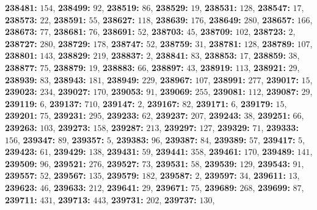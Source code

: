 \textsf{\bfseries 238481:} $154$, \textsf{\bfseries 238499:} $92$, \textsf{\bfseries 238519:} $86$, \textsf{\bfseries 238529:} $19$, \textsf{\bfseries 238531:} $128$, \textsf{\bfseries 238547:} $17$, \textsf{\bfseries 238573:} $22$, \textsf{\bfseries 238591:} $55$, \textsf{\bfseries 238627:} $118$, \textsf{\bfseries 238639:} $176$, \textsf{\bfseries 238649:} $280$, \textsf{\bfseries 238657:} $166$, \textsf{\bfseries 238673:} $77$, \textsf{\bfseries 238681:} $76$, \textsf{\bfseries 238691:} $52$, \textsf{\bfseries 238703:} $45$, \textsf{\bfseries 238709:} $102$, \textsf{\bfseries 238723:} $2$, \textsf{\bfseries 238727:} $280$, \textsf{\bfseries 238729:} $178$, \textsf{\bfseries 238747:} $52$, \textsf{\bfseries 238759:} $31$, \textsf{\bfseries 238781:} $128$, \textsf{\bfseries 238789:} $107$, \textsf{\bfseries 238801:} $143$, \textsf{\bfseries 238829:} $219$, \textsf{\bfseries 238837:} $2$, \textsf{\bfseries 238841:} $83$, \textsf{\bfseries 238853:} $17$, \textsf{\bfseries 238859:} $38$, \textsf{\bfseries 238877:} $75$, \textsf{\bfseries 238879:} $19$, \textsf{\bfseries 238883:} $66$, \textsf{\bfseries 238897:} $43$, \textsf{\bfseries 238919:} $113$, \textsf{\bfseries 238921:} $29$, \textsf{\bfseries 238939:} $83$, \textsf{\bfseries 238943:} $181$, \textsf{\bfseries 238949:} $229$, \textsf{\bfseries 238967:} $107$, \textsf{\bfseries 238991:} $277$, \textsf{\bfseries 239017:} $15$, \textsf{\bfseries 239023:} $234$, \textsf{\bfseries 239027:} $170$, \textsf{\bfseries 239053:} $91$, \textsf{\bfseries 239069:} $255$, \textsf{\bfseries 239081:} $112$, \textsf{\bfseries 239087:} $29$, \textsf{\bfseries 239119:} $6$, \textsf{\bfseries 239137:} $710$, \textsf{\bfseries 239147:} $2$, \textsf{\bfseries 239167:} $82$, \textsf{\bfseries 239171:} $6$, \textsf{\bfseries 239179:} $15$, \textsf{\bfseries 239201:} $75$, \textsf{\bfseries 239231:} $295$, \textsf{\bfseries 239233:} $62$, \textsf{\bfseries 239237:} $207$, \textsf{\bfseries 239243:} $38$, \textsf{\bfseries 239251:} $66$, \textsf{\bfseries 239263:} $103$, \textsf{\bfseries 239273:} $158$, \textsf{\bfseries 239287:} $213$, \textsf{\bfseries 239297:} $127$, \textsf{\bfseries 239329:} $71$, \textsf{\bfseries 239333:} $156$, \textsf{\bfseries 239347:} $89$, \textsf{\bfseries 239357:} $5$, \textsf{\bfseries 239383:} $96$, \textsf{\bfseries 239387:} $84$, \textsf{\bfseries 239389:} $57$, \textsf{\bfseries 239417:} $5$, \textsf{\bfseries 239423:} $61$, \textsf{\bfseries 239429:} $138$, \textsf{\bfseries 239431:} $59$, \textsf{\bfseries 239441:} $358$, \textsf{\bfseries 239461:} $170$, \textsf{\bfseries 239489:} $141$, \textsf{\bfseries 239509:} $96$, \textsf{\bfseries 239521:} $276$, \textsf{\bfseries 239527:} $73$, \textsf{\bfseries 239531:} $58$, \textsf{\bfseries 239539:} $129$, \textsf{\bfseries 239543:} $91$, \textsf{\bfseries 239557:} $52$, \textsf{\bfseries 239567:} $135$, \textsf{\bfseries 239579:} $182$, \textsf{\bfseries 239587:} $2$, \textsf{\bfseries 239597:} $34$, \textsf{\bfseries 239611:} $13$, \textsf{\bfseries 239623:} $46$, \textsf{\bfseries 239633:} $212$, \textsf{\bfseries 239641:} $29$, \textsf{\bfseries 239671:} $75$, \textsf{\bfseries 239689:} $268$, \textsf{\bfseries 239699:} $87$, \textsf{\bfseries 239711:} $431$, \textsf{\bfseries 239713:} $443$, \textsf{\bfseries 239731:} $202$, \textsf{\bfseries 239737:} $130$, 
